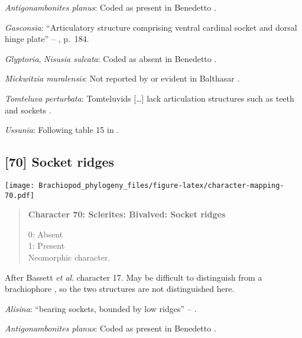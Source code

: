 \documentclass[openany]{book}
\theoremstyle{definition}
\theoremstyle{definition}
\theoremstyle{definition}
\theoremstyle{remark}
\begin{document}
\hypertarget{Antigonambonites_planus-coding-69}{}
\emph{Antigonambonites planus}: Coded as present in Benedetto
\citeyearpar{Benedetto2009iChaniella}.

\hypertarget{Gasconsia-coding-69}{}
\emph{Gasconsia}: ``Articulatory structure comprising ventral cardinal
socket and dorsal hinge plate'' --
\citet{Williams2000LinguliformeaCraniiformea}, p.~184.

\hypertarget{Glyptoria-coding-69}{}
\emph{Glyptoria}, \emph{Nisusia sulcata}: Coded as absent in Benedetto
\citeyearpar{Benedetto2009iChaniella}.

\hypertarget{Mickwitzia_muralensis-coding-69}{}
\emph{Mickwitzia muralensis}: Not reported by or evident in Balthasar
\citeyearpar{Balthasar2004Shellstructure}.

\hypertarget{Tomteluva_perturbata-coding-69}{}
\emph{Tomteluva perturbata}: Tomteluvids {[}\ldots{}{]} lack
articulation structures such as teeth and sockets
\citep{Streng2016Anew}.

\hypertarget{Ussunia-coding-69}{}
\emph{Ussunia}: Following table 15 in
\citet{Williams2000LinguliformeaCraniiformea}.

\subsection*{{[}70{]} Socket ridges}\label{socket-ridges}

\texttt{[image: Brachiopod\_phylogeny\_files/figure-latex/character-mapping-70.pdf]}

\begin{quote}
\textbf{Character 70: Sclerites: Bivalved: Socket ridges}

0: Absent\\
1: Present\\
Neomorphic character.
\end{quote}

After Bassett \emph{et al}.
\citeyearpar{Bassett2001Functionalmorphology} character 17. May be
difficult to distinguish from a brachiophore \citep[see Fig 323
in][]{Williams1997Introduction}, so the two structures are not
distinguished here.

\hypertarget{Alisina-coding-70}{}
\emph{Alisina}: ``bearing sockets, bounded by low ridges'' --
\citet{Williams2000LinguliformeaCraniiformea}.

\hypertarget{Antigonambonites_planus-coding-70}{}
\emph{Antigonambonites planus}: Coded as present in Benedetto
\citeyearpar{Benedetto2009iChaniella}.
\end{document}
